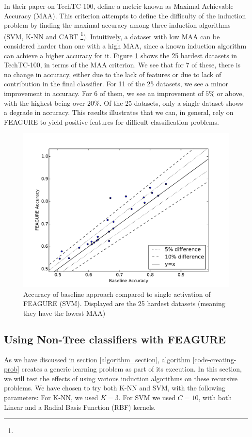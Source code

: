 \documentclass[twoside,11pt]{article}
\theoremstyle{definition}
\begin{document}
In their paper on TechTC-100,  define a metric known as Maximal Achievable Accuracy (MAA). This criterion attempts to define the difficulty of the induction problem by finding the maximal accuracy among three induction algorithms (SVM, K-NN and CART \footnote{}).
Intuitively, a dataset with low MAA can be considered harder than one with a high MAA, since a known induction algorithm can achieve a higher accuracy for it.
Figure \ref{fig:25best} shows the 25 hardest datasets in TechTC-100, in terms of the MAA criterion. 
We see that for 7 of these, there is no change in accuracy, either due to the lack of features or due to lack of contribution in the final classifier.
For 11 of the 25 datasets, we see a minor improvement in accuracy. For 6 of them, we see an improvement of $5\%$ or above, with the highest being over $20\%$.
Of the 25 datasets, only a single dataset shows a degrade in accuracy. This results illustrates that we can, in general, rely on FEAGURE to yield positive features for difficult classification problems.

\begin{figure}
	\centering
	\includegraphics[width=0.8\linewidth]{new_svm_10_25hardest}
	\caption{Accuracy of
		baseline approach compared to single activation of FEAGURE (SVM). Displayed are the 25 hardest datasets (meaning they have the lowest MAA)}
	\label{fig:25best}
\end{figure}

\subsection{Using Non-Tree classifiers with FEAGURE}

As we have discussed in section \ref{algorithm_section}, algorithm \ref{code-creating-prob} creates a generic learning problem as part of its execution. In this section, we will test the effects of using various induction algorithms on these recursive problems. We have chosen to try both K-NN and SVM, with the following parameters: For K-NN, we used $K=3$. For SVM we used $C=10$, with both Linear and a Radial Basis Function (RBF) kernels.
\end{document}
